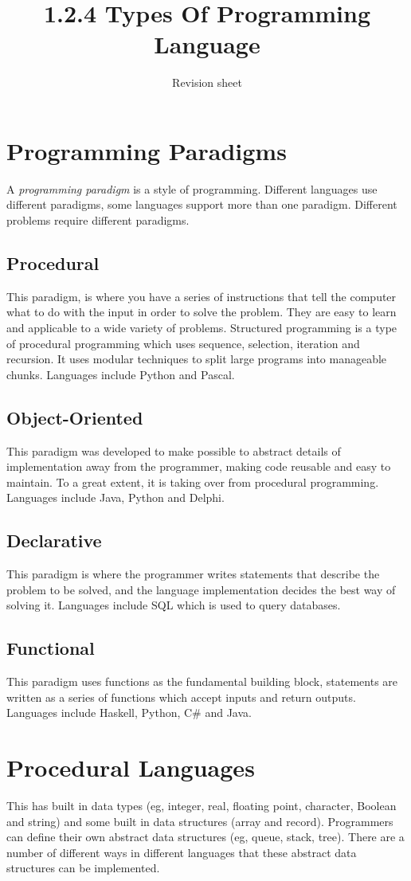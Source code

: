 \documentclass[a4paper,11pt, twocolumn]{article}
\title{1.2.4 Types Of Programming Language}
\author{Revision sheet}
\date{}
\begin{document}
\maketitle
\thispagestyle{fancy}

\section{Programming Paradigms}
A \textit{programming paradigm} is a style of programming. Different languages use different paradigms, some languages support more than one paradigm. Different problems require different paradigms.
\subsection{Procedural}
This paradigm, is where you have a series of instructions that tell the computer what to do with the input in order to solve the problem. They are easy to learn and applicable to a wide variety of problems. Structured programming is a type of procedural programming which uses sequence, selection, iteration and recursion. It uses modular techniques to split large programs into manageable chunks. Languages include Python and Pascal.
\subsection{Object-Oriented}
This paradigm was developed to make possible to abstract details of implementation away from the programmer, making code reusable and easy to maintain. To a great extent, it is taking over from procedural programming. Languages include Java, Python and Delphi.
\subsection{Declarative}
This paradigm is where the programmer writes statements that describe the problem to be solved, and the language implementation decides the best way of solving it. Languages include SQL which is used to query databases.
\subsection{Functional}
This paradigm uses functions as the fundamental building block, statements are written as a series of functions which accept inputs and return outputs. Languages include Haskell, Python, C\# and Java.

\section{Procedural Languages}
This has built in data types (eg, integer, real, floating point, character, Boolean and string) and some built in data structures (array and record). Programmers can define their own abstract data structures (eg, queue, stack, tree). There are a number of different ways in different languages that these abstract data structures can be implemented. 
\end{document}
